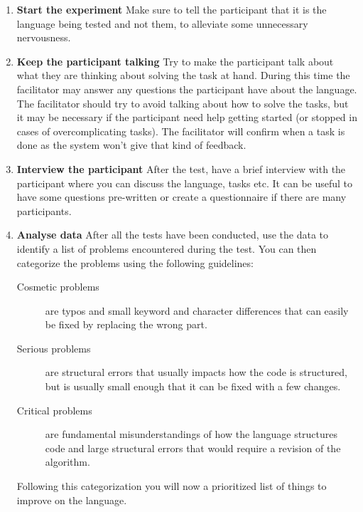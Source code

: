 \begin{enumerate}
\item \textbf{Start the experiment} Make sure to tell the participant that it is the language being tested and not them, to alleviate some unnecessary nervousness.
\item \textbf{Keep the participant talking} Try to make the participant talk about what they are thinking about solving the task at hand. During this time the facilitator may answer any questions the participant have about the language. The facilitator should try to avoid talking about how to solve the tasks, but it may be necessary if the participant need help getting started (or stopped in cases of overcomplicating tasks). The facilitator will confirm when a task is done as the system won't give that kind of feedback.
\item \textbf{Interview the participant} After the test, have a brief interview with the participant where you can discuss the language, tasks etc. It can be useful to have some questions pre-written or create a questionnaire if there are many participants.
\item \textbf{Analyse data} After all the tests have been conducted, use the data to identify a list of problems encountered during the test. You can then categorize the problems using the following guidelines:
\begin{description}
\item[Cosmetic problems] are typos and small keyword and character differences that can easily be fixed by replacing the wrong part.
\item[Serious problems] are structural errors that usually impacts how the code is structured, but is usually small enough that it can be fixed with a few changes.
\item[Critical problems] are fundamental misunderstandings of how the language structures code and large structural errors that would require a revision of the algorithm.
\end{description}
Following this categorization you will now a prioritized list of things to improve on the language.
\end{enumerate}